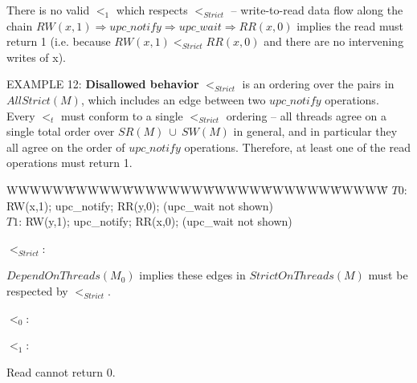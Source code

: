 \documentclass[12pt,titlepage]{article}
\newcounter{parnum}
\newcommand{\tab}{\textt{~~~~~~}}
\newcommand{\np}{
  \addtocounter{parnum}{1}
  \latex{\hspace{-2em}\makebox[2em][l]{\arabic{parnum}}}
  \html{{\bf {\arabic{parnum}}}\tab}}
\begin{document}
\bigskip
There is no valid $<_1$ which respects $<_{Strict}$ -- write-to-read data flow
along the chain $RW(x,1) \Rightarrow upc\_notify \Rightarrow upc\_wait \Rightarrow RR(x,0)$
implies the read must return 1 (i.e. because $RW(x,1) <_{Strict} RR(x,0)$ and there are no 
intervening writes of x).

\bigskip
\np EXAMPLE 12: \textbf{Disallowed behavior} 
$<_{Strict}$ is an ordering over the pairs in $AllStrict(M)$, which 
includes an edge between two $upc\_notify$ operations. Every $<_t$ must conform
to a single $<_{Strict}$ ordering -- all threads agree on a single total
order over $SR(M)\ \cup\ SW(M)$ in general, and in particular they all agree
on the order of $upc\_notify$ operations. Therefore, at least one of the
read operations must return 1.

\begin{tabbing}WWWWW\=WWWWW\=WWWWWWW\=WWWWW\=WWWWWW\=WWWWW\=\kill
$T0$: \> RW(x,1); \> upc\_notify; \> RR(y,0); \> (upc\_wait not shown)\\
$T1$: \> RW(y,1); \> upc\_notify; \> RR(x,0); \> (upc\_wait not shown)\\
\end{tabbing}

\bigskip
$<_{Strict}$:\\
\hspace{0.1in}
\parbox[t]{3in}
{$DependOnThreads(M_0)$ implies these edges in $StrictOnThreads(M)$ must be 
respected by $<_{Strict}$.\footnotemark}

\bigskip
$<_0$:\hspace{0.25in}
\hspace{0.4in}
\parbox[t]{2.5in}
{}

\bigskip
$<_1$:\hspace{0.25in}
\hspace{0.25in}
\parbox[t]{2in}
{ \vspace{0.5in} Read cannot return 0. }
\end{document}
